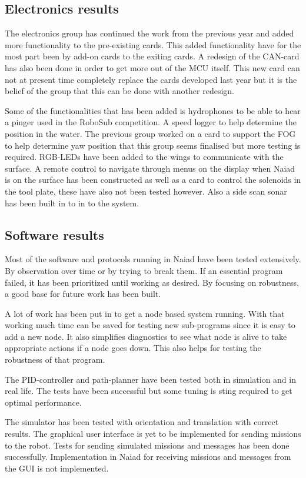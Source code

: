 \subsection{Electronics results}
The electronics group has continued the work from the previous year and added more functionality to the pre-existing cards. This added functionality have for the most part been by add-on cards to the exiting cards. A redesign of the CAN-card has also been done in order to get more out of the MCU itself. This new card can not at present time completely replace the cards developed last year but it is the belief of the group that this can be done with another redesign.  

Some of the functionalities that has been added is hydrophones to be able to hear a pinger used in the RoboSub competition. A speed logger to help determine the position in the water. The previous group worked on a card to support the FOG to help determine yaw position that this group seems finalised but more testing is required. RGB-LEDs have been added to the wings to communicate with the surface. A remote control to navigate through menus on the display when Naiad is on the surface has been constructed as well as a card to control the solenoids in the tool plate, these have also not been tested however. Also a side scan sonar has been built in to in to the system.  

\subsection{Software results}
Most of the software and protocols running in Naiad have been tested extensively. By observation over time or by trying to break them. If an essential program failed, it has been prioritized until working as desired. By focusing on robustness, a good base for future work has been built.

A lot of work has been put in to get a node based system running. With that working much time can be saved for testing new sub-programs since it is easy to add a new node. It also simplifies diagnostics to see what node is alive to take appropriate actions if a node goes down. This also helps for testing the robustness of that program. 

The PID-controller and path-planner have been tested both in simulation and in real life. The tests have been successful but some tuning is sting required to get optimal performance.

The simulator has been tested with orientation and translation with correct results.
The graphical user interface is yet to be implemented for sending missions to the robot. Tests for sending simulated missions and messages has been done successfully. Implementation in Naiad for receiving missions and messages from the GUI is not implemented.

